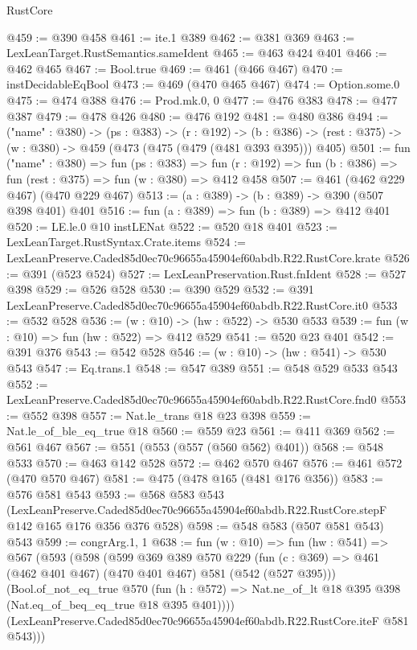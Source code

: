 \begin{lexlean}{RustCore}
\begin{coremodule}
@459 := @390 @458
@461 := ite.{1} @389
@462 := @381 @369
@463 := LexLeanTarget.RustSemantics.sameIdent
@465 := @463 @424 @401
@466 := @462 @465
@467 := Bool.true
@469 := @461 (@466 @467)
@470 := instDecidableEqBool
@473 := @469 (@470 @465 @467)
@474 := Option.some.{0}
@475 := @474 @388
@476 := Prod.mk.{0, 0}
@477 := @476 @383
@478 := @477 @387
@479 := @478 @426
@480 := @476 @192
@481 := @480 @386
@494 := ("name" : @380) ->
  (ps : @383) ->
  (r : @192) ->
  (b : @386) -> (rest : @375) -> (w : @380) -> @459 (@473 (@475 (@479 (@481 @393 @395))) @405)
@501 := fun ("name" : @380) =>
  fun (ps : @383) =>
  fun (r : @192) => fun (b : @386) => fun (rest : @375) => fun (w : @380) => @412 @458
@507 := @461 (@462 @229 @467) (@470 @229 @467)
@513 := (a : @389) -> (b : @389) -> @390 (@507 @398 @401) @401
@516 := fun (a : @389) => fun (b : @389) => @412 @401
@520 := LE.le.{0} @10 instLENat
@522 := @520 @18 @401
@523 := LexLeanTarget.RustSyntax.Crate.items
@524 := LexLeanPreserve.Caded85d0ec70c96655a45904ef60abdb.R22.RustCore.krate
@526 := @391 (@523 @524)
@527 := LexLeanPreservation.Rust.fnIdent
@528 := @527 @398
@529 := @526 @528
@530 := @390 @529
@532 := @391 LexLeanPreserve.Caded85d0ec70c96655a45904ef60abdb.R22.RustCore.it0
@533 := @532 @528
@536 := (w : @10) -> (hw : @522) -> @530 @533
@539 := fun (w : @10) => fun (hw : @522) => @412 @529
@541 := @520 @23 @401
@542 := @391 @376
@543 := @542 @528
@546 := (w : @10) -> (hw : @541) -> @530 @543
@547 := Eq.trans.{1}
@548 := @547 @389
@551 := @548 @529 @533 @543
@552 := LexLeanPreserve.Caded85d0ec70c96655a45904ef60abdb.R22.RustCore.fnd0
@553 := @552 @398
@557 := Nat.le_trans @18 @23 @398
@559 := Nat.le_of_ble_eq_true @18
@560 := @559 @23
@561 := @411 @369
@562 := @561 @467
@567 := @551 (@553 (@557 (@560 @562) @401))
@568 := @548 @533
@570 := @463 @142 @528
@572 := @462 @570 @467
@576 := @461 @572 (@470 @570 @467)
@581 := @475 (@478 @165 (@481 @176 @356))
@583 := @576 @581 @543
@593 := @568
    @583
    @543
    (LexLeanPreserve.Caded85d0ec70c96655a45904ef60abdb.R22.RustCore.stepF
      @142
      @165
      @176
      @356
      @376
      @528)
@598 := @548 @583 (@507 @581 @543) @543
@599 := congrArg.{1, 1}
@638 := fun (w : @10) =>
  fun (hw : @541) =>
  @567
    (@593
      (@598
        (@599
          @369
          @389
          @570
          @229
          (fun (c : @369) => @461 (@462 @401 @467) (@470 @401 @467) @581 (@542 (@527 @395)))
          (Bool.of_not_eq_true
            @570
            (fun (h : @572) => Nat.ne_of_lt @18 @395 @398 (Nat.eq_of_beq_eq_true @18 @395 @401))))
        (LexLeanPreserve.Caded85d0ec70c96655a45904ef60abdb.R22.RustCore.iteF @581 @543)))

\end{coremodule}
\end{lexlean}
